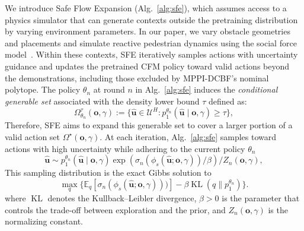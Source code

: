 \documentclass[letterpaper, 10 pt, conference]{ieeeconf}
\renewcommand{\o}{\mathbf{o}}
\begin{document}
We introduce Safe Flow Expansion (Alg.~\ref{alg:sfe}), which assumes access to a physics simulator that can generate contexts outside the pretraining distribution by varying environment parameters.
In our paper, we vary obstacle geometries and placements and simulate reactive pedestrian dynamics using the social force model~\cite{helbing1995social}.
Within these contexts, SFE iteratively samples actions with uncertainty guidance and updates the pretrained CFM policy toward valid actions beyond the demonstrations, including those excluded by MPPI-DCBF's nominal polytope.
The policy \(\theta_n\) at round $n$ in Alg.~\ref{alg:sfe} induces the \textit{conditional generable set} associated with the  density lower bound \(\tau\) defined as:
\begin{equation}
    \Omega_{\theta_n}^{\tau}(\o,\gamma)
    :=\{
    \hat{\mathbf u}\in\mathcal U^H:
    p_1^{\theta_n}(\hat{\mathbf u}\mid\o,\gamma)\ge\tau
    \},
    \label{eq:conditional-generable-set}
\end{equation}
Therefore, SFE aims to expand this generable set to cover a larger portion of a valid action set $\Omega^\star(\o,\gamma)$. 
At each iteration, Alg.~\ref{alg:sfe} samples toward actions with high uncertainty while adhering to the current policy ${\theta_n}$
\begin{equation}
\hat{\mathbf u}
\sim
p_1^{\theta_n}(\hat{\mathbf u}\mid\o,\gamma)\exp\!\left(\sigma_n\!\left(\phi_s(\hat{\mathbf u};\o,\gamma)\right)\!\big/\!\beta\right)
\!\big/\!Z_n(\o,\gamma)
,
\label{eq:importancesampling}
\end{equation}
This sampling distribution is the exact Gibbs solution to
\begin{equation}
\max_q \{
\mathbb{E}_q[\sigma_n(\phi_s(\hat{\mathbf u};\o,\gamma)))]
-\beta\operatorname{KL}(q\parallel p_1^{\theta_n})
\}.
\end{equation}
where $\operatorname{KL}$ denotes the Kullback--Leibler divergence, $\beta>0$ is the parameter that controls the trade-off between exploration and the prior,  
and $Z_n(\o,\gamma)$ is the normalizing constant.
\end{document}
